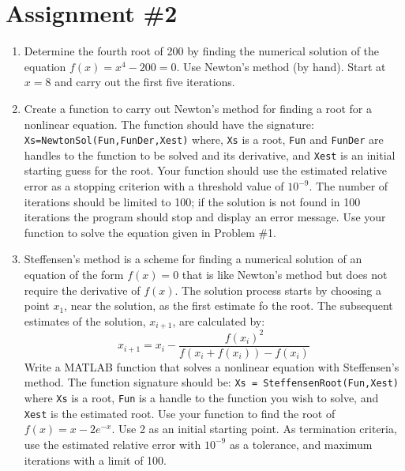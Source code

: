 \chapter{Assignment \#2}
\label{ch:ass2n}
\begin{fullwidth}

\begin{enumerate}
\item Determine the fourth root of 200 by finding the numerical solution of the equation $f(x) = x^4 - 200 = 0$.  Use Newton's method (by hand).  Start at $x=8$ and carry out the first five iterations.

\vspace{2.0cm}

\item Create a function to carry out Newton's method for finding a root for a nonlinear equation.  The function should have the signature: \lstinline[style=myMatlab]{Xs=NewtonSol(Fun,FunDer,Xest)} where, \lstinline[style=myMatlab]{Xs} is a root, \lstinline[style=myMatlab]{Fun} and \lstinline[style=myMatlab]{FunDer} are handles to the function to be solved and its derivative, and \lstinline[style=myMatlab]{Xest} is an initial starting guess for the root.  Your function should use the estimated relative error as a stopping criterion with a threshold value of $10^{-9}$.  The number of iterations should be limited to 100; if the solution is not found in 100 iterations the program should stop and display an error message.  Use your function to solve the equation given in Problem \#1.

\vspace{2.0cm}

\item Steffensen's method is a scheme for finding a numerical solution of an equation of the form $f(x)=0$ that is like Newton's method but does not require the derivative of $f(x)$.  The solution process starts by choosing a point $x_1$, near the solution, as the first estimate fo the root.  The subsequent estimates of the solution, $x_{i+1}$, are calculated by:
\begin{equation*}
x_{i+1} = x_i - \frac{f(x_i)^2}{f(x_i + f(x_i)) - f(x_i)}
\end{equation*}
Write a MATLAB function that solves a nonlinear equation with Steffensen's method.  The function signature should be: \lstinline[style=myMatlab]{Xs = SteffensenRoot(Fun,Xest)} where \lstinline[style=myMatlab]{Xs} is a root, \lstinline[style=myMatlab]{Fun} is a handle to the function you wish to solve, and \lstinline[style=myMatlab]{Xest} is the estimated root.  Use your function to find the root of $f(x) = x-2e^{-x}$.  Use 2 as an initial starting point.  As termination criteria, use the estimated relative error with $10^{-9}$ as a tolerance, and maximum iterations with a limit of 100.



\end{enumerate}
\end{fullwidth}

